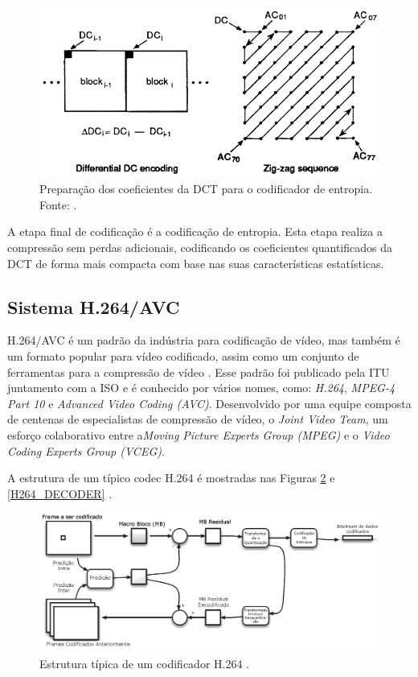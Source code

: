 \begin{figure}[h]
	\centering
	\includegraphics[scale=0.55]{figuras/ZIG-ZAG.png}
	\caption{Preparação dos coeficientes da DCT para o codificador de entropia. Fonte: \cite{wallace1991jpeg}.}
	\label{ZIG_ZAG}
\end{figure}

A etapa final de codificação é a codificação de entropia.  Esta etapa realiza a compressão sem perdas adicionais, codificando os coeficientes quantificados da DCT de forma mais compacta com base nas suas características estatísticas.

\subsection{Sistema H.264/AVC} \label{H264}

H.264/AVC é um padrão da indústria para codificação de vídeo, mas também é um formato popular para vídeo codificado, assim como um conjunto de ferramentas para a compressão de vídeo \cite{richardson2011h}. Esse padrão foi publicado pela ITU juntamento com a ISO e é conhecido por vários nomes, como: \textit{H.264}, \textit{MPEG-4 Part 10} e \textit{Advanced Video Coding (AVC)}. Desenvolvido por uma equipe composta de centenas de especialistas de compressão de vídeo, o \textit{Joint Video Team}, um esforço colaborativo entre a\textit{Moving Picture Experts Group (MPEG)} e o \textit{Video Coding Experts Group (VCEG)}.

A estrutura de um típico codec H.264 é mostradas nas Figuras \ref{H264_ENCODER} e \ref{H264_DECODER} \cite{richardson2011h}.

\begin{figure}[h]
	\centering
	\includegraphics[scale=0.45]{figuras/H264_CODIFICADOR.png}
	\caption{Estrutura típica de um codificador H.264 \cite{richardson2011h}.}
	\label{H264_ENCODER}
\end{figure}

